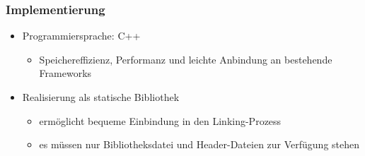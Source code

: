 \mode*

\begin{frame}
  \frametitle{Implementierung}
  \begin{itemize}
    \item Programmiersprache: C++
      \begin{itemize}
        \item Speichereffizienz, Performanz und leichte Anbindung an bestehende Frameworks
      \end{itemize}
    \item Realisierung als statische Bibliothek
      \begin{itemize}
        \item erm\"oglicht bequeme Einbindung in den Linking-Prozess
        \item es m\"ussen nur Bibliotheksdatei und Header-Dateien zur Verf\"ugung stehen
      \end{itemize}
  \end{itemize}
\end{frame}

